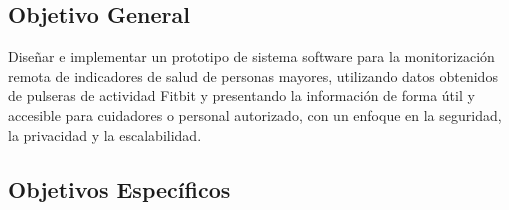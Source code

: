 \subsection{Objetivo General}
\label{subsec:obj_general}

Diseñar e implementar un prototipo de sistema software para la monitorización remota de indicadores de salud de personas mayores, utilizando datos obtenidos de pulseras de actividad Fitbit\textsuperscript{\textregistered} y presentando la información de forma útil y accesible para cuidadores o personal autorizado, con un enfoque en la seguridad, la privacidad y la escalabilidad.

\subsection{Objetivos Específicos}
\label{subsec:obj_especificos}

